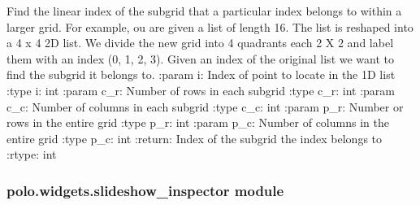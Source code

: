 \documentclass[letterpaper,10pt,english]{sphinxmanual}
\begin{document}
\begin{fulllineitems}
\begin{fulllineitems}
\label{\detokenize{polo.widgets:polo.widgets.plate_viewer.plateViewer.well_index_to_subgrid}}
Find the linear index of the subgrid that a particular index belongs to
within a larger grid. For example, ou are given a list of length 16. The list is reshaped into a 4 x 4
2D list. We divide the new grid into 4 quadrants each 2 X 2 and label them
with an index (0, 1, 2, 3). Given an index of the original list we want to
find the subgrid it belongs to. 
:param i: Index of point to locate in the 1D list
:type i: int
:param c\_r: Number of rows in each subgrid
:type c\_r: int
:param c\_c: Number of columns in each subgrid
:type c\_c: int
:param p\_r: Number or rows in the entire grid
:type p\_r: int
:param p\_c: Number of columns in the entire grid
:type p\_c: int
:return: Index of the subgrid the index  belongs to
:rtype: int

\end{fulllineitems}


\begin{fulllineitems}
\label{\detokenize{polo.widgets:polo.widgets.plate_viewer.plateViewer.wheelEvent}}
\end{fulllineitems}


\end{fulllineitems}



\subsubsection{polo.widgets.slideshow\_inspector module}
\label{\detokenize{polo.widgets:module-polo.widgets.slideshow_inspector}}\label{\detokenize{polo.widgets:polo-widgets-slideshow-inspector-module}}
\end{document}
